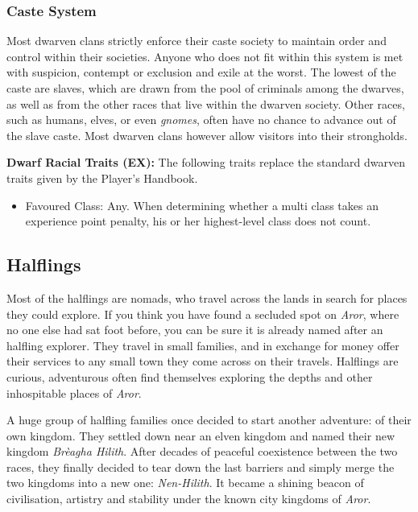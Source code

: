 \subsubsection*{Caste System}

Most dwarven clans strictly enforce their caste society to maintain order and
control within their societies. Anyone who does not fit within this system is
met with suspicion, contempt or exclusion and exile at the worst. The lowest
of the caste are slaves, which are drawn from the pool of criminals among the
dwarves, as well as from the other races that live within the dwarven society.
Other races, such as humans, elves, or even \emph{gnomes}, often have no chance
to advance out of the slave caste. Most dwarven clans however allow visitors
into their strongholds.

\begin{35e}
  \textbf{Dwarf Racial Traits (EX):} The following traits replace the standard
  dwarven traits given by the Player's Handbook.
  \begin{itemize}[noitemsep]
    \item Favoured Class: Any. When determining whether a multi class takes an
    experience point penalty, his or her highest-level class does not count.
  \end{itemize}
\end{35e}

\subsection*{Halflings}

Most of the halflings are nomads, who travel across the lands in search for
places they could explore. If you think you have found a secluded spot on
\emph{Aror}, where no one else had sat foot before, you can be sure it is
already named after an halfling explorer. They travel in small families, and
in exchange for money offer their services to any small town they come across
on their travels. Halflings are curious, adventurous often find themselves
exploring the depths and other inhospitable places of \emph{Aror}.

A huge group of halfling families once decided to start another adventure: of
their own kingdom. They settled down near an elven kingdom and named their new
kingdom \emph{Brèagha Hilith}. After decades of peaceful coexistence between
the two races, they finally decided to tear down the last barriers and simply
merge the two kingdoms into a new one: \emph{Nen-Hilith}. It became a shining
beacon of civilisation, artistry and stability under the known city kingdoms
of \emph{Aror}.

